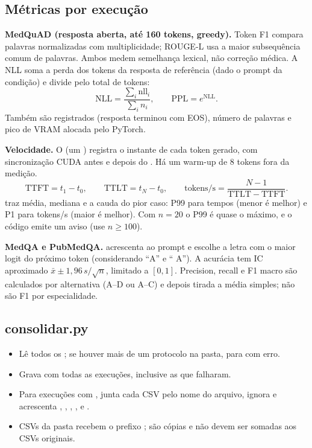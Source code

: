 \documentclass[11pt]{article}
\begin{document}
\subsection{Métricas por execução}

\textbf{MedQuAD (resposta aberta, até 160 tokens, greedy).}
Token F1 compara palavras normalizadas com multiplicidade; ROUGE-L usa a maior subsequência comum de palavras. Ambos medem semelhança lexical, não correção médica.
A NLL soma a perda dos tokens da resposta de referência (dado o prompt da condição) e divide pelo total de tokens:
\[
\mathrm{NLL} = \frac{\sum_i \mathrm{nll}_i}{\sum_i n_i}, \qquad \mathrm{PPL} = e^{\mathrm{NLL}} .
\]
Também são registrados  (resposta terminou com EOS), número de palavras e pico de VRAM alocada pelo PyTorch.

\textbf{Velocidade.} O  (um ) registra o instante de cada token gerado, com sincronização CUDA antes e depois do . Há um warm-up de 8 tokens fora da medição.
\[
\mathrm{TTFT} = t_1 - t_0, \qquad \mathrm{TTLT} = t_N - t_0, \qquad \text{tokens/s} = \frac{N-1}{\mathrm{TTLT}-\mathrm{TTFT}} .
\]
 traz média, mediana e a cauda do pior caso: P99 para tempos (menor é melhor) e P1 para tokens/s (maior é melhor). Com $n=20$ o P99 é quase o máximo, e o código emite um aviso (use $n\geq100$).

\textbf{MedQA e PubMedQA.}  acrescenta  ao prompt e escolhe a letra com o maior logit do próximo token (considerando ``A'' e `` A''). A acurácia tem IC aproximado $\bar{x} \pm 1{,}96\, s/\sqrt{n}$, limitado a $[0,1]$.
Precision, recall e F1 macro são calculados por alternativa (A--D ou A--C) e depois tirada a média simples; não são F1 por especialidade.

\subsection{consolidar.py}

\begin{itemize}
\item Lê todos os ; se houver mais de um protocolo na pasta, para com erro.
\item Grava  com todas as execuções, inclusive as que falharam.
\item Para execuções com , junta cada CSV pelo nome do arquivo, ignora  e acrescenta , , , ,  e .
\item CSVs da pasta  recebem o prefixo ; são cópias e não devem ser somadas aos CSVs originais.
\end{itemize}
\end{document}
